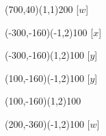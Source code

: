 \documentclass[12pt]{article}
\begin{document}
\begin{figure}[htb]
\begin{egame}
\putbranch(700,40)(1,1){200}
\ib{}{}[$w$]

\renewcommand{\egarrowstyle}{e}

\putbranch(-300,-160)(-1,2){100}
\ib{}{}[$x$]

\renewcommand{\egarrowstyle}{e}

\putbranch(-300,-160)(1,2){100}
\ib{}{}[$y$]

\renewcommand{\egarrowstyle}{e}

\putbranch(100,-160)(-1,2){100}
[$y$]

\renewcommand{\egarrowstyle}{e}

\putbranch(100,-160)(1,2){100}

\renewcommand{\egarrowstyle}{e}

\putbranch(200,-360)(-1,2){100}
\ib{}{}[$w$]

\renewcommand{\egarrowstyle}{e}


\end{egame}
\end{figure}
\end{document}
